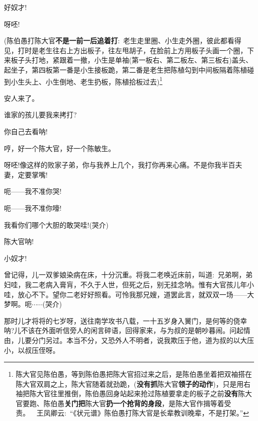 {好奴才!

呀呸!


({陈伯愚{\hwfs 打}陈大官{\bfseries\hwfs 不是一前一后追着打}}:~老生{\hwfs 走里圈}、小生{\hwfs 走外圈}，{\hwfs 彼此都看得见}，{\hwfs 打时是}老生{\hwfs 往右上方出板子}，{\hwfs 往左甩胡子}，{\hwfs 在脸前上方用板子头画一个圈}，{\hwfs 下来板子头打地}，{\hwfs 紧跟着一撤}，小生{\hwfs 是单袖}({\hwfs 第一板右}、{\hwfs 第二板左}、{\hwfs 第三板右}){\hwfs 盖头}、{\hwfs 起坐子}，{\hwfs 第四板第一番是}小生{\hwfs 接板跪}，{\hwfs 第二番是}老生{\hwfs 把}陈植{\hwfs 勾到中间板隔着}陈植{\hwfs 碰到}小生{\hwfs 头上}、小生{\hwfs 倒地}、老生{\hwfs 扔板}，陈植{\hwfs 拾板过去})\footnote{陈大官{\hwfs 见}陈伯愚，{\hwfs 等到}陈伯愚{\hwfs 把}陈大官{\hwfs 招过来之后}，{\hwfs 是}陈伯愚{\hwfs 坐着把双袖搭在}陈大官{\hwfs 双肩之上}，陈大官{\hwfs 随着就劲跪}，({\bfseries\hwfs 没有抓}陈大官{\bfseries\hwfs 领子的动作})，{\hwfs 只是用右袖把}陈大官{\hwfs 往里推倒}，陈伯愚{\hwfs 回身站起来抢过}陈植{\hwfs 要拿走的板子之前}{\bfseries\hwfs 没有}陈大官{\hwfs 要跑}、陈伯愚{\bfseries\hwfs 关门把}陈大官{\bfseries\hwfs 扔一个抢背的身段}，{\hwfs 是}陈大官{\hwfs 作揖等着受责}。~~{王凤卿云:~``{\hei 《状元谱》陈伯愚打陈大官是长辈教训晚辈，不是打架。}''}}


安人来了。

谁家的孩儿要我来拷打?

你自己去看呐!

哼，好一个陈大官，好一个陈敏生。

呀呸!像这样的败家子弟，你与我养上几个，我打你再来心痛。不是你我半百夫妻，定要掌嘴!

呃------我不准你哭!

呃------我不准你嚎!

我看你们哪个大胆的敢哭哇!({\hwfs 哭介})

陈大官呐!

小奴才!

曾记得，儿一双爹娘染病在床，十分沉重。将我二老唤近床前，叫道:~兄弟啊，弟妇哇，我二老病入膏肓，不久于人世，但死之后，别无挂念呐。惟有大官孩儿年小哇，放心不下。望你二老好好照看。可怜我那兄嫂，道罢此言，就双双一场------大梦啊。呃$\cdots{}\cdots{}$({\hwfs 哭介})

那时儿才将将的七岁呀，送往南学攻书八载，一十五岁身入黉门，是何等的侥幸呐?儿不该在外面听信旁人的闲言碎语，回得家来，与为叔的是朝吵暮闹。问起情由，儿要分门另过。本当不分，又恐外人不明者，说我欺压于他，道为叔的以大压小，以叔压侄呀。

}
